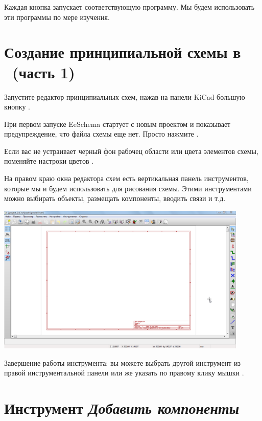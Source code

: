 Каждая кнопка запускает соответствующую программу. Мы будем использовать эти
программы по мере изучения.

\section{Создание принципиальной схемы в \ (часть 1)}

Запустите редактор принципиальных схем, нажав на панели KiCad большую кнопку
.

При первом запуске EeSchema стартует с новым проектом и показывает
предупреждение, что файла схемы еще нет. Просто нажмите .

Если вас не устраивает черный фон рабочец области или цвета элементов схемы,
поменяйте настроки цветов . 

На правом краю окна редактора схем есть вертикальная панель инструментов,
которые мы и будем использовать для рисования схемы. Этими инструментами можно
выбирать объекты, размещать компоненты, вводить связи и т.д.

\includegraphics[width=0.9\textwidth]{kicad/ee15.png}

Завершение работы инструмента: вы можете выбрать другой инструмент из правой
инструментальной панели или же указать  по правому
клику мышки \keys{\rms}.

\section{Инструмент \emph{Добавить компоненты}}

